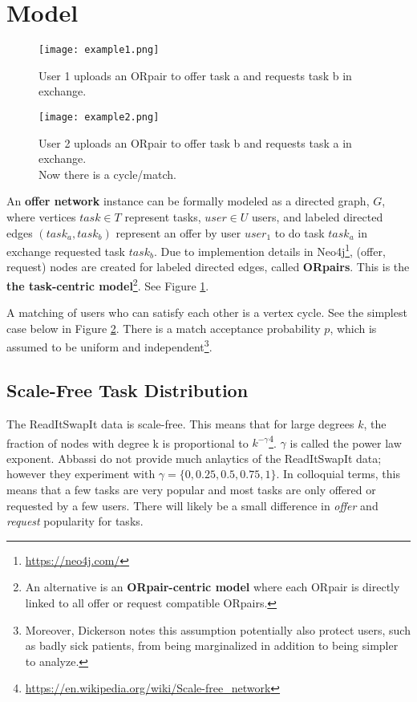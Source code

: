\documentclass[main.tex]{subfiles}
\begin{document}
\section{Model}

\begin{figure}
  \texttt{[image: example1.png]}
  \caption{User 1 uploads an ORpair to offer task a and requests task b in exchange.}
  \label{example1}
\end{figure}

\begin{figure}
  \texttt{[image: example2.png]}
  \caption{User 2 uploads an ORpair to offer task b and requests task a in exchange.
           \\Now there is a cycle/match.}
  \label{example2}
\end{figure}

An \textbf{offer network} instance can be formally modeled as a directed graph, $G$, where vertices $task \in T$ represent tasks, $user \in U$ users, and labeled directed edges $(task_a,task_b)$ represent an offer by user $user_1$ to do task $task_a$ in exchange requested task $task_b$. Due to implemention details in Neo4j\footnote{\url{https://neo4j.com/}}, (offer, request) nodes are created for labeled directed edges, called \textbf{ORpairs}. This is the \textbf{the task-centric model}\footnote{An alternative is an \textbf{ORpair-centric model} where each ORpair is directly linked to all offer or request compatible ORpairs.}.  See Figure \ref{example1}.

A matching of users who can satisfy each other is a vertex cycle. See the simplest case below in Figure \ref{example2}. There is a match acceptance probability $p$, which is assumed to be uniform and independent\footnote{Moreover, Dickerson \cite{Dick} notes this assumption potentially also protect users, such as badly sick patients, from being marginalized in addition to being simpler to analyze.}.

\subsection{Scale-Free Task Distribution}
The ReadItSwapIt data is scale-free. This means that for large degrees $k$, the fraction of nodes with degree k is proportional to $k^{-\gamma}$\footnote{\url{https://en.wikipedia.org/wiki/Scale-free_network}}. $\gamma$ is called the power law exponent. Abbassi \cite{Abb2} do not provide much anlaytics of the ReadItSwapIt data; however they experiment with $\gamma = \{0,0.25,0.5,0.75,1\}$. In colloquial terms, this means that a few tasks are very popular and most tasks are only offered or requested by a few users. There will likely be a small difference in \textit{offer} and \textit{request} popularity for tasks.
\end{document}
